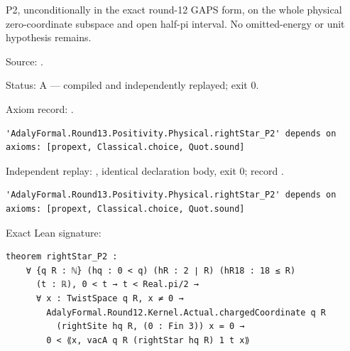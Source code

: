 \begin{theorem}[bp-498]
\label{bp-498}
\leanok
P2, unconditionally in the exact round-12 GAPS form, on the whole physical zero-coordinate subspace and open half-pi interval. No omitted-energy or unit hypothesis remains.

\par Source: \texttt{}.
\par Status: A — compiled and independently replayed; exit 0.
\par Axiom record: \texttt{}.
\begin{verbatim}
'AdalyFormal.Round13.Positivity.Physical.rightStar_P2' depends on axioms: [propext, Classical.choice, Quot.sound]
\end{verbatim}
\par Independent replay: \texttt{}, identical declaration body, exit 0; record \texttt{}.
\begin{verbatim}
'AdalyFormal.Round13.Positivity.Physical.rightStar_P2' depends on axioms: [propext, Classical.choice, Quot.sound]
\end{verbatim}
\par Exact Lean signature:
\begin{verbatim}
theorem rightStar_P2 :
    ∀ {q R : ℕ} (hq : 0 < q) (hR : 2 ∣ R) (hR18 : 18 ≤ R)
      (t : ℝ), 0 < t → t < Real.pi/2 →
      ∀ x : TwistSpace q R, x ≠ 0 →
        AdalyFormal.Round12.Kernel.Actual.chargedCoordinate q R
          (rightSite hq R, (0 : Fin 3)) x = 0 →
        0 < ⟪x, vacA q R (rightStar hq R) 1 t x⟫
\end{verbatim}
\end{theorem}

